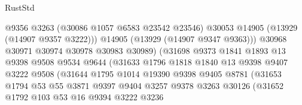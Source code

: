 \begin{lexlean}{RustStd}
\begin{coremodule}
                                      @9356
                                      @3263
                                      (@30086 @1057 @6583 @23542 @23546)
                                      @30053
                                      @14905
                                      (@13929 (@14907 @9357 @3222)))
                                    @14905
                                    (@13929 (@14907 @9347 @9363)))
                                  @30968
                                  @30971
                                  @30974
                                  @30978
                                  @30983
                                  @30989)
                                (@31698
                                  @9373
                                  @1841
                                  @1893
                                  @13
                                  @9398
                                  @9508
                                  @9534
                                  @9644
                                  (@31633
                                    @1796
                                    @1818
                                    @1840
                                    @13
                                    @9398
                                    @9407
                                    @3222
                                    @9508
                                    (@31644
                                      @1795
                                      @1014
                                      @19390
                                      @9398
                                      @9405
                                      @8781
                                      (@31653
                                        @1794
                                        @53
                                        @55
                                        @3871
                                        @9397
                                        @9404
                                        @3257
                                        @9378
                                        @3263
                                        @30126
                                        (@31652
                                          @1792
                                          @103
                                          @53
                                          @16
                                          @9394
                                          @3222
                                          @3236

\end{coremodule}
\end{lexlean}
